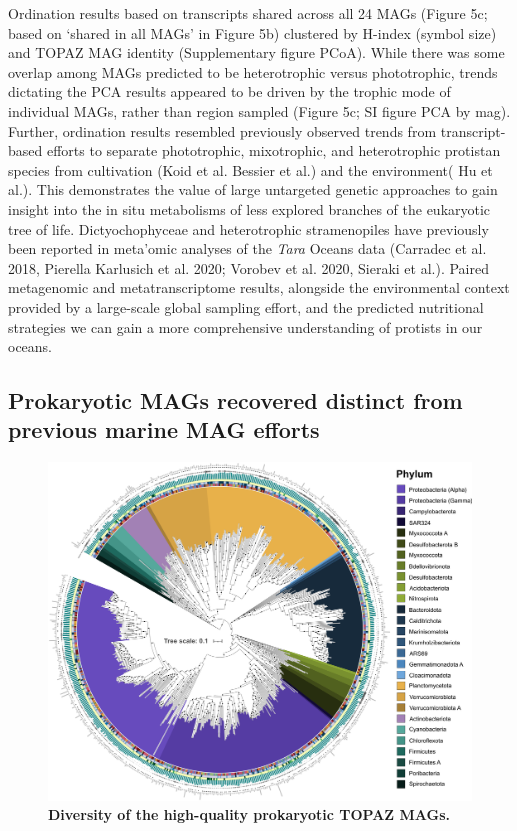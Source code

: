 \documentclass[12pt]{article}
\numberwithin{equation}{section}
\begin{document}
Ordination results based on transcripts shared across all 24 MAGs (Figure 5c; based on ‘shared in all MAGs’ in Figure 5b) clustered by H-index (symbol size) and TOPAZ MAG identity (Supplementary figure PCoA). While there was some overlap among MAGs predicted to be heterotrophic versus phototrophic, trends dictating the PCA results appeared to be driven by the trophic mode of individual MAGs, rather than region sampled (Figure 5c; SI figure PCA by mag). Further, ordination results resembled previously observed trends from transcript-based efforts to separate phototrophic, mixotrophic, and heterotrophic protistan species from cultivation (Koid et al. Bessier et al.) and the environment( Hu et al.). This demonstrates the value of large untargeted genetic approaches to gain insight into the in situ metabolisms of less explored branches of the eukaryotic tree of life. Dictyochophyceae and heterotrophic stramenopiles have previously been reported in meta’omic analyses of the \textit{Tara} Oceans data (Carradec et al. 2018, Pierella Karlusich et al. 2020; Vorobev et al. 2020, Sieraki et al.). Paired metagenomic and metatranscriptome results, alongside the environmental context provided by a large-scale global sampling effort, and the predicted nutritional strategies we can gain a more comprehensive understanding of protists in our oceans.


\subsection*{Prokaryotic MAGs recovered distinct from previous marine MAG efforts}

\begin{figure}[h!]    
    \centering
    \includegraphics[width = 0.95\columnwidth]{figures/Figure1-TOPAZ-HQ-NR_bac.png}
    \caption{\textbf{Diversity of the high-quality prokaryotic TOPAZ MAGs.} }
    \label{fig:fig1-prokaryotes}
\end{figure}
\end{document}
